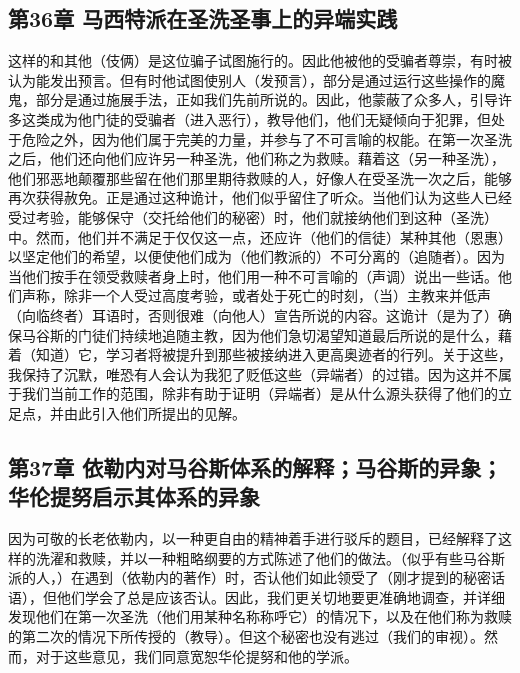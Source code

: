 
\subsection{第36章 马西特派在圣洗圣事上的异端实践}

这样的和其他（伎俩）是这位骗子试图施行的。因此他被他的受骗者尊崇，有时被认为能发出预言。但有时他试图使别人（发预言），部分是通过运行这些操作的魔鬼，部分是通过施展手法，正如我们先前所说的。因此，他蒙蔽了众多人，引导许多这类成为他门徒的受骗者（进入恶行），教导他们，他们无疑倾向于犯罪，但处于危险之外，因为他们属于完美的力量，并参与了不可言喻的权能。在第一次圣洗之后，他们还向他们应许另一种圣洗，他们称之为救赎。藉着这（另一种圣洗），他们邪恶地颠覆那些留在他们那里期待救赎的人，好像人在受圣洗一次之后，能够再次获得赦免。正是通过这种诡计，他们似乎留住了听众。当他们认为这些人已经受过考验，能够保守（交托给他们的秘密）时，他们就接纳他们到这种（圣洗）中。然而，他们并不满足于仅仅这一点，还应许（他们的信徒）某种其他（恩惠）以坚定他们的希望，以便使他们成为（他们教派的）不可分离的（追随者）。因为当他们按手在领受救赎者身上时，他们用一种不可言喻的（声调）说出一些话。他们声称，除非一个人受过高度考验，或者处于死亡的时刻，（当）主教来并低声（向临终者）耳语时，否则很难（向他人）宣告所说的内容。这诡计（是为了）确保马谷斯的门徒们持续地追随主教，因为他们急切渴望知道最后所说的是什么，藉着（知道）它，学习者将被提升到那些被接纳进入更高奥迹者的行列。关于这些，我保持了沉默，唯恐有人会认为我犯了贬低这些（异端者）的过错。因为这并不属于我们当前工作的范围，除非有助于证明（异端者）是从什么源头获得了他们的立足点，并由此引入他们所提出的见解。\par


\subsection{第37章 依勒内对马谷斯体系的解释；马谷斯的异象；华伦提努启示其体系的异象}

因为可敬的长老依勒内，以一种更自由的精神着手进行驳斥的题目，已经解释了这样的洗濯和救赎，并以一种粗略纲要的方式陈述了他们的做法。（似乎有些马谷斯派的人，）在遇到（依勒内的著作）时，否认他们如此领受了（刚才提到的秘密话语），但他们学会了总是应该否认。因此，我们更关切地要更准确地调查，并详细发现他们在第一次圣洗（他们用某种名称称呼它）的情况下，以及在他们称为救赎的第二次的情况下所传授的（教导）。但这个秘密也没有逃过（我们的审视）。然而，对于这些意见，我们同意宽恕华伦提努和他的学派。\par

